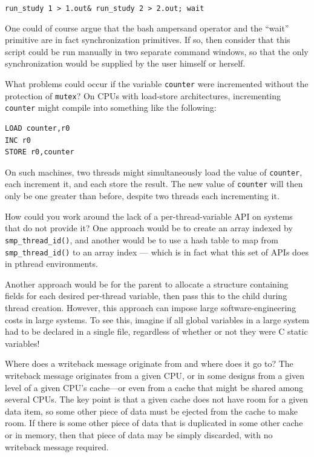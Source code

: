 	{ \scriptsize \tt run\_study 1 > 1.out\& run\_study 2 > 2.out; wait}

	One could of course argue that the bash ampersand operator and
	the ``wait'' primitive are in fact synchronization primitives.
	If so, then consider that
	this script could be run manually in two separate
	command windows, so that the only synchronization would be
	supplied by the user himself or herself.

\QuickQ{}
	What problems could occur if the variable {\tt counter} were
	incremented without the protection of {\tt mutex}?
\QuickA{}
	On CPUs with load-store architectures, incrementing {\tt counter}
	might compile into something like the following:

\vspace{5pt}
\begin{minipage}[t]{\columnwidth}
\small
\begin{verbatim}
LOAD counter,r0
INC r0
STORE r0,counter
\end{verbatim}
\end{minipage}
\vspace{5pt}

	On such machines, two threads might simultaneously load the
	value of {\tt counter}, each increment it, and each store the
	result.
	The new value of {\tt counter} will then only be one greater
	than before, despite two threads each incrementing it.

\QuickQ{}
	How could you work around the lack of a per-thread-variable
	API on systems that do not provide it?
\QuickA{}
	One approach would be to create an array indexed by
	{\tt smp\_thread\_id()}, and another would be to use a hash
	table to map from {\tt smp\_thread\_id()} to an array
	index --- which is in fact what this
	set of APIs does in pthread environments.

	Another approach would be for the parent to allocate a structure
	containing fields for each desired per-thread variable, then
	pass this to the child during thread creation.
	However, this approach can impose large software-engineering
	costs in large systems.
	To see this, imagine if all global variables in a large system
	had to be declared in a single file, regardless of whether or
	not they were C static variables!

\QuickQ{}
	Where does a writeback message originate from and where does
	it go to?
\QuickA{}
	The writeback message originates from a given CPU, or in some
	designs from a given level of a given CPU's cache---or even
	from a cache that might be shared among several CPUs.
	The key point is that a given cache does not have room for
	a given data item, so some other piece of data must be ejected
	from the cache to make room.
	If there is some other piece of data that is duplicated in some
	other cache or in memory, then that piece of data may be simply
	discarded, with no writeback message required.

